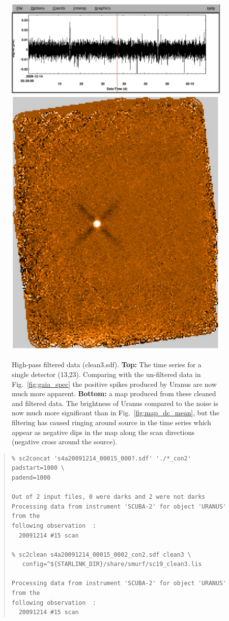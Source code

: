 \documentclass[twoside,11pt]{article}
\renewcommand{\_}{\texttt{\symbol{95}}}
\newenvironment{myquote}{\begin{quote}\begin{small}}{\end{small}\end{quote}}
\begin{document}
\begin{figure}
\begin{center}
\includegraphics[width=\linewidth]{sc19_spec_filt} \\
\vspace{0.3in}
\includegraphics[width=0.5\linewidth]{sc19_map_highpass}
\caption{High-pass filtered data (clean3.sdf). {\bf Top:} The time
  series for a single detector (13,23). Comparing with the un-filtered
  data in Fig.~\ref{fig:gaia_spec} the positive spikes produced by
  Uranus are now much more apparent. {\bf Bottom:} a map produced from
  these cleaned and filtered data. The brightness of Uranus compared
  to the noise is now much more significant than in
  Fig.~\ref{fig:map_dc_mean}, but the filtering has caused
  ringing around source in the time series which appear as
  negative dips in the map along the scan directions (negative cross
  around the source).}
\label{fig:highpass}
\end{center}
\end{figure}

\begin{myquote}
\begin{verbatim}
% sc2concat 's4a20091214_00015_000?.sdf' './*_con2' padstart=1000 \
padend=1000

Out of 2 input files, 0 were darks and 2 were not darks
Processing data from instrument 'SCUBA-2' for object 'URANUS' from the
following observation  :
  20091214 #15 scan

% sc2clean s4a20091214_00015_0002_con2.sdf clean3 \
   config=^${STARLINK_DIR}/share/smurf/sc19_clean3.lis

Processing data from instrument 'SCUBA-2' for object 'URANUS' from the
following observation  :
  20091214 #15 scan

\end{verbatim}
\end{myquote}
\end{document}
